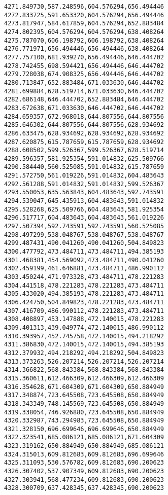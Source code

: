 \documentclass[11pt]{article}
\begin{document}
\begin{Verbatim}[commandchars=\\\{\}]
4271.849730,587.248596,604.576294,656.494446
4272.833725,591.653320,604.576294,656.494446
4273.817947,584.617859,604.576294,652.883484
4274.802395,604.576294,604.576294,638.408264
4275.787070,606.198792,606.198792,638.408264
4276.771971,656.494446,656.494446,638.408264
4277.757100,681.939270,656.494446,646.444702
4278.742455,698.594421,656.494446,646.444702
4279.728038,674.908325,656.494446,646.444702
4280.713847,652.883484,671.033630,646.444702
4281.699884,628.519714,671.033630,646.444702
4282.686148,646.444702,652.883484,646.444702
4283.672638,671.033630,646.444702,646.444702
4284.659357,672.968018,644.807556,644.807556
4285.646302,644.807556,644.807556,628.934692
4286.633475,628.934692,628.934692,628.934692
4287.620875,615.787659,615.787659,628.934692
4288.608502,599.526367,599.526367,628.519714
4289.596357,581.925354,591.014832,625.509766
4290.584440,560.525085,591.014832,615.787659
4291.572750,561.019226,591.014832,604.483643
4292.561288,591.014832,591.014832,599.526367
4293.550053,635.563843,604.483643,592.743591
4294.539047,645.435913,604.483643,591.014832
4295.528268,625.509766,604.483643,581.925354
4296.517717,604.483643,604.483643,561.019226
4297.507394,592.743591,592.743591,560.525085
4298.497299,538.048767,538.048767,538.048767
4299.487431,490.041260,490.041260,504.849823
4300.477792,473.484711,473.484711,494.385193
4301.468381,454.569092,473.484711,490.041260
4302.459199,461.646881,473.484711,486.990112
4303.450244,471.973328,473.484711,478.221283
4304.441518,478.221283,478.221283,473.484711
4305.433020,494.385193,478.221283,473.484711
4306.424750,504.849823,478.221283,473.484711
4307.416709,486.990112,478.221283,473.484711
4308.408897,453.147888,472.140015,478.221283
4309.401313,439.049774,472.140015,486.990112
4310.393957,452.745758,472.140015,494.218292
4311.386830,472.140015,472.140015,494.385193
4312.379932,494.218292,494.218292,504.849823
4313.373263,526.207214,526.207214,526.207214
4314.366822,568.843384,568.843384,568.843384
4315.360611,612.466309,612.466309,612.466309
4316.354628,671.604309,671.604309,650.884949
4317.348874,723.645508,723.645508,650.884949
4318.343349,748.145569,723.645508,650.884949
4319.338054,746.926880,723.645508,650.884949
4320.332987,743.294983,723.645508,650.884949
4321.328150,696.699646,696.699646,650.884949
4322.323541,685.086121,685.086121,671.604309
4323.319162,650.884949,650.884949,685.086121
4324.315013,609.812683,609.812683,696.699646
4325.311093,530.576782,609.812683,690.200623
4326.307402,537.907349,609.812683,690.200623
4327.303941,568.477234,609.812683,690.200623
4328.300709,637.428345,637.428345,690.200623

\end{Verbatim}
\end{document}
